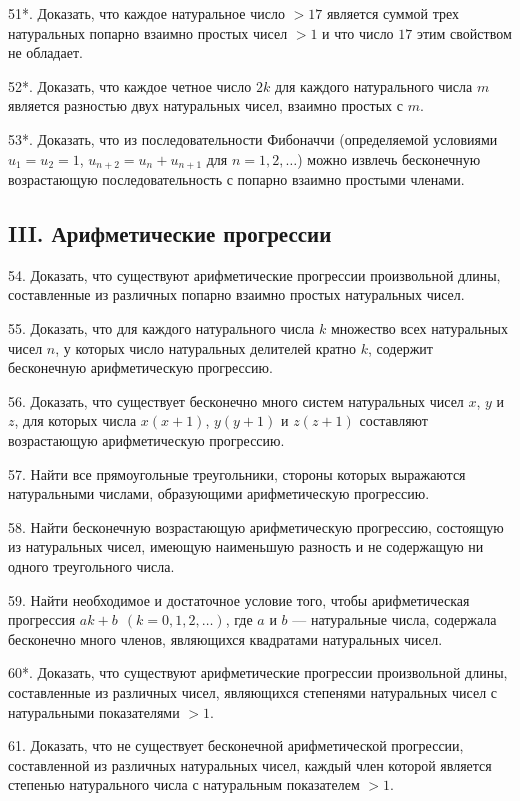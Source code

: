 \documentclass[12pt, a4paper, openany]{book}
\begin{document}
51*. Доказать, что каждое натуральное число $>17$ является суммой трех натуральных попарно взаимно простых чисел $>1$ и что число $17$ этим свойством не обладает.

52*. Доказать, что каждое четное число $2k$ для каждого натурального числа $m$ является разностью двух натуральных чисел, взаимно простых с $m$.

53*. Доказать, что из последовательности Фибоначчи (определяемой условиями $u_1=u_2=1$, $u_{n+2}=u_n+u_{n+1}$ для $n=1, 2, \ldots$) можно извлечь бесконечную возрастающую последовательность с попарно взаимно простыми членами.

\subsection[III. Арифметические прогрессии (54-75)]{\center III. Арифметические прогрессии}

54. Доказать, что существуют арифметические прогрессии произвольной длины, составленные из различных попарно взаимно простых	натуральных чисел.

55. Доказать, что для каждого натурального числа $k$ множество всех натуральных чисел $n$, у которых число натуральных делителей кратно $k$, содержит бесконечную арифметическую прогрессию.

56. Доказать, что существует бесконечно много систем натуральных чисел $x$, $y$ и $z$, для которых числа $x(x+1)$, $y(y+1)$ и $z(z+1)$ составляют возрастающую арифметическую прогрессию.

57. Найти все прямоугольные треугольники, стороны которых выражаются натуральными числами, образующими арифметическую прогрессию.

58. Найти бесконечную возрастающую арифметическую прогрессию,	состоящую из натуральных чисел, имеющую наименьшую разность и не содержащую ни одного треугольного числа.

59. Найти необходимое и достаточное условие того, чтобы арифметическая прогрессия $ak+b \ \ (k=0,1,2, \ldots)$, где $a$ и $b$ — натуральные числа, содержала бесконечно много членов, являющихся квадратами натуральных чисел.

60*. Доказать, что существуют арифметические прогрессии произвольной длины, составленные из различных чисел, являющихся степенями натуральных чисел с натуральными показателями $>1$.

61. Доказать, что не существует бесконечной арифметической прогрессии, составленной из различных натуральных чисел, каждый член которой является степенью натурального числа с натуральным показателем $>1$.
\end{document}
